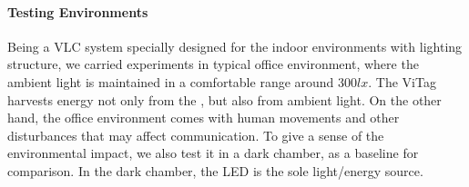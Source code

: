 \paragraph{Testing Environments}
Being a VLC system specially designed for the indoor environments with lighting structure, we carried experiments in typical office environment, where the ambient light is maintained in a comfortable range around 300$lx$. The ViTag harvests energy not only from the \reader, but also from ambient light. On the other hand, the office environment comes with human movements and other disturbances that may affect communication. To give a sense of the environmental impact, we also test it in a dark chamber, as a baseline for comparison. In the dark chamber, the \reader LED is the sole light/energy source. 
                                                                                                                                                                                                                                                                                                                                                                                                                                                                                                                                                                                                                                                                                                                                                                                                                                                                                                                                                                                                                                                                                                                                                         
